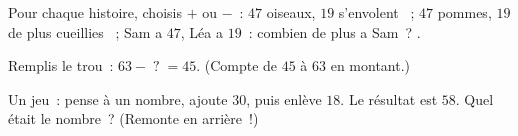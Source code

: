 \begin{exercise}[$\star$]\label{exo:g2:subtraction:8}
Pour chaque histoire, choisis $+$ ou $-$~:
\guillemotleft{} $47$ oiseaux, $19$ s'envolent \guillemotright{}~;
\guillemotleft{} $47$ pommes, $19$ de plus cueillies
\guillemotright{}~; \guillemotleft{} Sam a $47$, Léa a $19$~:
combien de plus a Sam~? \guillemotright{}.
\end{exercise}

\begin{exercise}[$\star$]\label{exo:g2:subtraction:9}
Remplis le trou~: $63 - \;?\; = 45$. (Compte de $45$ à $63$ en
montant.)
\end{exercise}

\begin{exercise}[$\star\star$]\label{exo:g2:subtraction:10}
Un jeu~: pense à un nombre, ajoute $30$, puis enlève $18$. Le
résultat est $58$. Quel était le nombre~? (Remonte en arrière~!)
\end{exercise}
